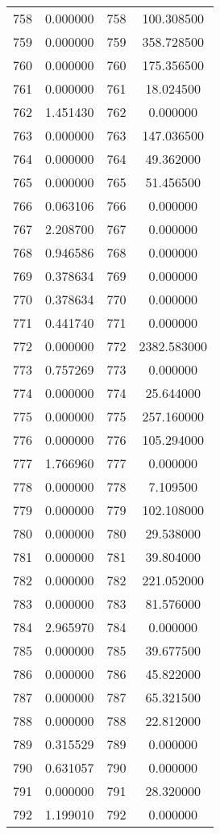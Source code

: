 \documentclass[12pt]{article}
\begin{document}
\begin{longtable}{@{}cccc@{}}
758 & 0.000000 & 758 & 100.308500 \\
759 & 0.000000 & 759 & 358.728500 \\
760 & 0.000000 & 760 & 175.356500 \\
761 & 0.000000 & 761 & 18.024500 \\
762 & 1.451430 & 762 & 0.000000 \\
763 & 0.000000 & 763 & 147.036500 \\
764 & 0.000000 & 764 & 49.362000 \\
765 & 0.000000 & 765 & 51.456500 \\
766 & 0.063106 & 766 & 0.000000 \\
767 & 2.208700 & 767 & 0.000000 \\
768 & 0.946586 & 768 & 0.000000 \\
769 & 0.378634 & 769 & 0.000000 \\
770 & 0.378634 & 770 & 0.000000 \\
771 & 0.441740 & 771 & 0.000000 \\
772 & 0.000000 & 772 & 2382.583000 \\
773 & 0.757269 & 773 & 0.000000 \\
774 & 0.000000 & 774 & 25.644000 \\
775 & 0.000000 & 775 & 257.160000 \\
776 & 0.000000 & 776 & 105.294000 \\
777 & 1.766960 & 777 & 0.000000 \\
778 & 0.000000 & 778 & 7.109500 \\
779 & 0.000000 & 779 & 102.108000 \\
780 & 0.000000 & 780 & 29.538000 \\
781 & 0.000000 & 781 & 39.804000 \\
782 & 0.000000 & 782 & 221.052000 \\
783 & 0.000000 & 783 & 81.576000 \\
784 & 2.965970 & 784 & 0.000000 \\
785 & 0.000000 & 785 & 39.677500 \\
786 & 0.000000 & 786 & 45.822000 \\
787 & 0.000000 & 787 & 65.321500 \\
788 & 0.000000 & 788 & 22.812000 \\
789 & 0.315529 & 789 & 0.000000 \\
790 & 0.631057 & 790 & 0.000000 \\
791 & 0.000000 & 791 & 28.320000 \\
792 & 1.199010 & 792 & 0.000000 \\

\end{longtable}
\end{document}

